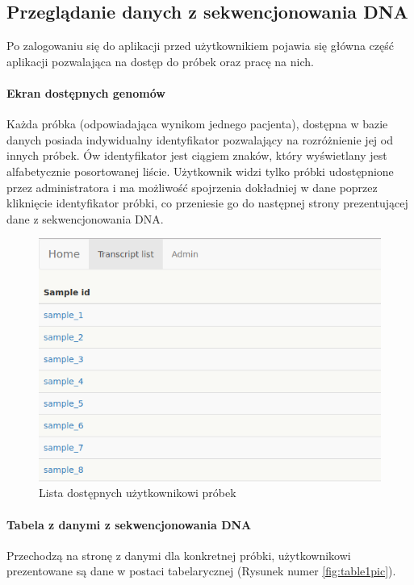 \documentclass[a4paper,12pt,twoside]{article}
\begin{document}
\newpage
\subsection{Przeglądanie danych z sekwencjonowania DNA} \label{sssec:dnaPage}
Po zalogowaniu się do aplikacji przed użytkownikiem pojawia się główna część aplikacji pozwalająca na dostęp do próbek oraz pracę na nich.

\paragraph{Ekran dostępnych genomów}
Każda próbka (odpowiadająca wynikom jednego pacjenta), dostępna w bazie danych posiada indywidualny identyfikator pozwalający na
rozróżnienie jej od innych próbek. Ów identyfikator jest ciągiem znaków, który wyświetlany jest
alfabetycznie posortowanej liście. Użytkownik widzi tylko próbki udostępnione przez administratora
i ma możliwość spojrzenia dokładniej w dane poprzez kliknięcie identyfikator próbki,
co przeniesie go do następnej strony prezentującej dane z sekwencjonowania DNA.

\begin{figure}[h!]
\includegraphics[width=\linewidth]{obrazy/aplikacja/sample_list.png}
\caption{Lista dostępnych użytkownikowi próbek}
\label{fig:sample_listpic}
\end{figure}

\newpage
\paragraph{Tabela z danymi z sekwencjonowania DNA}
Przechodzą na stronę z danymi dla konkretnej próbki, użytkownikowi prezentowane są
dane w postaci tabelarycznej (Rysunek numer \ref{fig:table1pic}).
\end{document}
